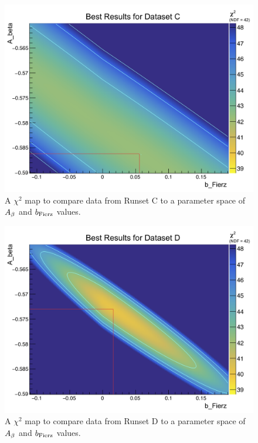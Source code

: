 \begin{figure}[h!tb]
	\centering
	\includegraphics[width=.999\linewidth]
	{Figures/Chi2_2D_SetC.png}
	\caption[$\chi^2$ Map for Runset C]{A $\chi^2$ map to compare data from Runset C to a parameter space of $A_{\beta}$ and $b_{\mathrm{Fierz}}$ values.}	
	\label{fig:2dchi2_setC}
\end{figure}
%
\begin{figure}[h!tb]
	\centering
	\includegraphics[width=.999\linewidth]
	{Figures/Chi2_2D_SetD.png}
	\caption[$\chi^2$ Map for Runset D]{A $\chi^2$ map to compare data from Runset D to a parameter space of $A_{\beta}$ and $b_{\mathrm{Fierz}}$ values.}	
	\label{fig:2dchi2_setD}
\end{figure}




